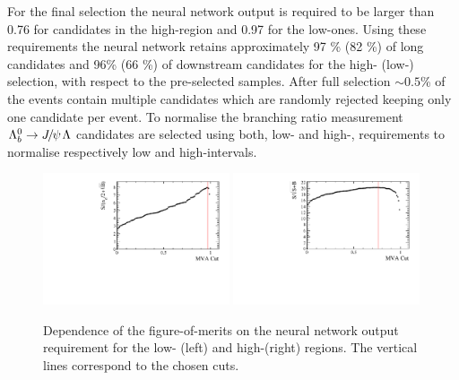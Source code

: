 For the final selection the neural network output is required to be larger than 0.76 for candidates in the high-\qsq region
and 0.97 for the low-\qsq ones. Using these requirements the neural network retains approximately 97 \% (82 \%) of long 
candidates and 96\% (66 \%) of downstream candidates for the high- (low-) \qsq selection, with respect to
the pre-selected samples. After full selection $\sim 0.5$\% of the events contain multiple candidates
which are randomly rejected keeping only one candidate per event. 
%
%
To normalise the branching ratio measurement $\Lb\to\jpsi\Lz$ candidates are selected using both, low- and high-\qsq, 
requirements to normalise respectively low and high-\qsq intervals. 
%
\begin{figure}
\centering
\includegraphics[width=0.49\textwidth]{Lmumu/figs/Lmumu_lowQ2_FoM.pdf}
\includegraphics[width=0.49\textwidth]{Lmumu/figs/Lmumu_highQ2_FoM.pdf}
\caption{Dependence of the figure-of-merits on the neural network output requirement for the low-\qsq
(left) and high-\qsq (right) regions. The vertical lines correspond to the chosen cuts.}
\label{fig:Lb_FOM}
\end{figure}
%
